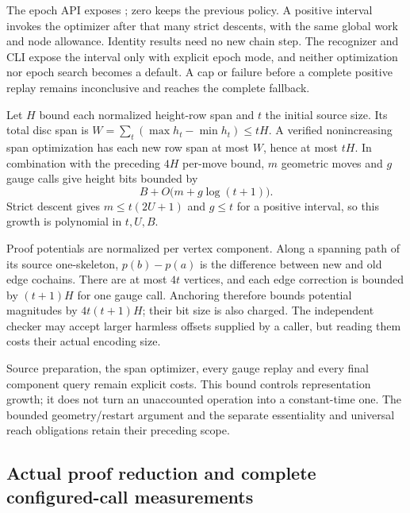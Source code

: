 The epoch API exposes ; zero keeps the previous
policy. A positive interval invokes the optimizer after that many strict
descents, with the same global work and node allowance. Identity results
need no new chain step. The recognizer and CLI expose the interval only with
explicit epoch mode, and neither optimization nor epoch search becomes a
default. A cap or failure before a complete positive replay remains
inconclusive and reaches the complete fallback.

Let $H$ bound each normalized height-row span and $t$ the initial source
size. Its total disc span is $W=\sum_t(\max h_t-\min h_t)\le tH$.
A verified nonincreasing span optimization has each new row span at most
$W$, hence at most $tH$. In combination with the preceding $4H$ per-move
bound, $m$ geometric moves and $g$ gauge calls give height bits bounded by
\[
                 B+O\bigl(m+g\log(t+1)\bigr).
\]
Strict descent gives $m\le t(2U+1)$ and $g\le t$ for a positive interval,
so this growth is polynomial in $t,U,B$.

Proof potentials are normalized per vertex component. Along a spanning
path of its source one-skeleton, $p(b)-p(a)$ is the difference between new
and old edge cochains. There are at most $4t$ vertices, and each edge
correction is bounded by $(t+1)H$ for one gauge call. Anchoring therefore
bounds potential magnitudes by $4t(t+1)H$; their bit size is also charged.
The independent checker may accept larger harmless offsets supplied by a
caller, but reading them costs their actual encoding size.

Source preparation, the span optimizer, every gauge replay and every final
component query remain explicit costs. This bound controls representation
growth; it does not turn an unaccounted operation into a constant-time one.
The bounded geometry/restart argument and the separate essentiality and
universal reach obligations retain their preceding scope.

\subsection{Actual proof reduction and complete configured-call measurements}

